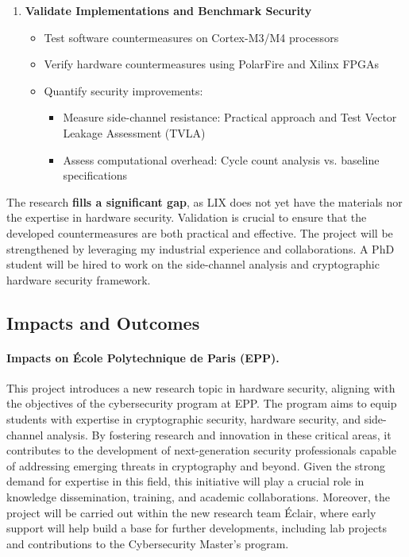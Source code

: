 \documentclass[11pt, a4paper]{article}
\begin{document}
\begin{enumerate}
\item \textbf{Validate Implementations and Benchmark Security}
\begin{itemize}[leftmargin=2em]
    \item Test software countermeasures on Cortex-M3/M4 processors
    \item Verify hardware countermeasures using PolarFire and Xilinx FPGAs
    \item Quantify security improvements:
    \begin{itemize}
        \item Measure side-channel resistance: Practical approach and Test Vector Leakage Assessment (TVLA)
        \item Assess computational overhead: Cycle count analysis vs. baseline specifications
    \end{itemize}
\end{itemize}
\end{enumerate}
The research \textbf{fills a significant gap}, as LIX does not yet have 
the materials nor the expertise in hardware security. 
Validation is crucial to ensure that the developed countermeasures 
are both practical and effective. The project will be strengthened by 
leveraging my industrial experience and collaborations. 
A PhD student will be hired to work on the side-channel 
analysis and cryptographic hardware security framework. 


\subsection*{Impacts and Outcomes}

\paragraph{Impacts on \'Ecole Polytechnique de Paris (EPP).}
This project introduces a new research topic in hardware security, 
aligning with the objectives of the cybersecurity program at 
EPP. 
The program aims to equip students with expertise in 
cryptographic security, hardware security, and side-channel analysis. 
By fostering research and innovation in these critical areas, 
it contributes to the development of next-generation security 
professionals capable of addressing emerging threats in 
cryptography and beyond. Given the strong demand for expertise 
in this field, this initiative will play a crucial role in knowledge 
dissemination, training, and academic collaborations. Moreover, the 
project will be carried out within the new research team \'Eclair, 
where early support will help build a base for further developments, 
including lab projects and contributions to the Cybersecurity 
Master's program.
\end{document}
